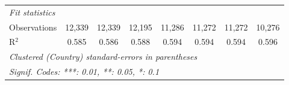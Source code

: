 \begin{tabular}{lccccccc}
   \midrule \emph{Fit statistics}\\
   Observations                                                            & 12,339  & 12,339        & 12,195        & 11,286        & 11,272        & 11,272        & 10,276\\  
   R$^2$                                                                   & 0.585   & 0.586         & 0.588         & 0.594         & 0.594         & 0.594         & 0.596\\  
   \midrule
   \multicolumn{8}{l}{\emph{Clustered (Country) standard-errors in parentheses}}\\
   \multicolumn{8}{l}{\emph{Signif. Codes: ***: 0.01, **: 0.05, *: 0.1}}\\
\end{tabular}
\par\endgroup


